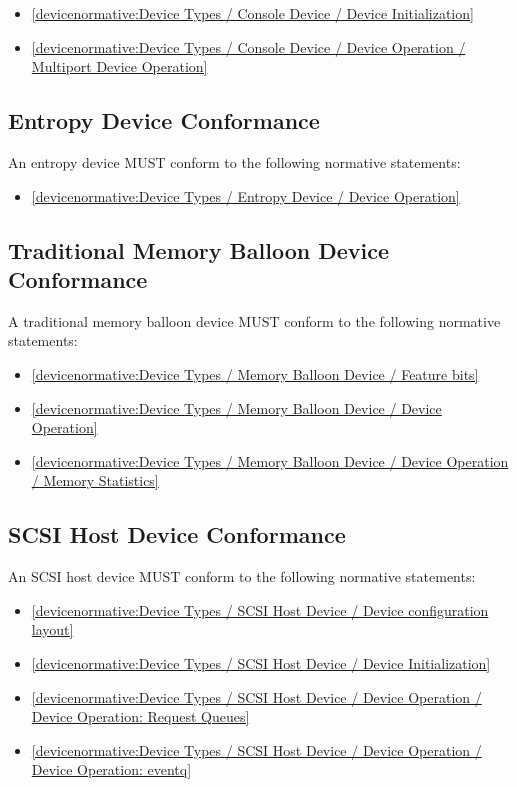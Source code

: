 \begin{itemize}
\item \ref{devicenormative:Device Types / Console Device / Device Initialization}
\item \ref{devicenormative:Device Types / Console Device / Device Operation / Multiport Device Operation}
\end{itemize}

\subsection{Entropy Device Conformance}\label{sec:Conformance / Device Conformance / Entropy Device Conformance}

An entropy device MUST conform to the following normative statements:

\begin{itemize}
\item \ref{devicenormative:Device Types / Entropy Device / Device Operation}
\end{itemize}

\subsection{Traditional Memory Balloon Device Conformance}\label{sec:Conformance / Device Conformance / Traditional Memory Balloon Device Conformance}

A traditional memory balloon device MUST conform to the following normative statements:

\begin{itemize}
\item \ref{devicenormative:Device Types / Memory Balloon Device / Feature bits}
\item \ref{devicenormative:Device Types / Memory Balloon Device / Device Operation}
\item \ref{devicenormative:Device Types / Memory Balloon Device / Device Operation / Memory Statistics}
\end{itemize}

\subsection{SCSI Host Device Conformance}\label{sec:Conformance / Device Conformance / SCSI Host Device Conformance}

An SCSI host device MUST conform to the following normative statements:

\begin{itemize}
\item \ref{devicenormative:Device Types / SCSI Host Device / Device configuration layout}
\item \ref{devicenormative:Device Types / SCSI Host Device / Device Initialization}
\item \ref{devicenormative:Device Types / SCSI Host Device / Device Operation / Device Operation: Request Queues}
\item \ref{devicenormative:Device Types / SCSI Host Device / Device Operation / Device Operation: eventq}
\end{itemize}

